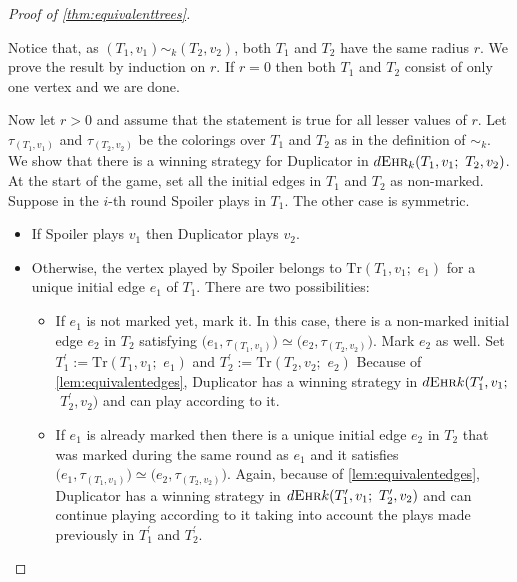 \documentclass[12pt,notitlepage,a4paper]{article}
\theoremstyle{definition}
\newcommand{\morph}[1]{\sim_#1}
\newcommand{\ehr}{\textsc{Ehr}}
\begin{document}
\begin{proof}[Proof of \cref{thm:equivalenttrees}]~ \par
	Notice that, as $(T_1,v_1)\morph{k} (T_2,v_2)$, both $T_1$ and
	$T_2$ have the same radius $r$.
	We prove the result by induction on $r$.
	If $r=0$ then both $T_1$ and $T_2$ consist
	of only one vertex and we are done. \par
	Now let $r>0$ and assume that the 
	statement is true for all lesser values of $r$.
	Let $\tau_{(T_1,v_1)}$ and $\tau_{(T_2,v_2)}$ 
	be the colorings over $T_1$ and $T_2$ as in 
	the definition of $\sim_k$. 
	We show that there is a winning strategy 
	for Duplicator in
	$d\ehr_k(T_1,v_1;\,\, T_2,v_2)$.
	At the start of the game, set all the initial edges
	in $T_1$ and $T_2$ as non-marked. 
	Suppose in the $i$-th round Spoiler plays in 
	$T_1$. The other case is symmetric. 
	\begin{itemize}[leftmargin=*]
		\item If Spoiler plays $v_1$ then Duplicator plays $v_2$.
		\item Otherwise, the vertex played by Spoiler belongs to
		$\mathrm{Tr}(T_1,v_1;\,\,e_1)$
		for a unique initial edge $e_1$ of $T_1$. 
		There are two possibilities:
		\begin{itemize}[leftmargin=*]
			\item If $e_1$ is not marked yet, mark it. 
			In this case, there is a 
			non-marked initial
			edge $e_2$ in $T_2$ satisfying 
			$\big(e_1,\tau_{(T_1,v_1)}\big)\simeq
			\big(e_2,\tau_{(T_2,v_2)}  \big)$.
			Mark $e_2$ as well. 
			Set $T^\prime_1:=\mathrm{Tr}(T_1,v_1;\,\,e_1)$
			and
			$T^\prime_2:=\mathrm{Tr}(T_2,v_2;\,\,e_2)$
			Because of
			\cref{lem:equivalentedges}, Duplicator
			has a winning strategy in
			$ d\ehr{k}(T^\prime_1, v_1;$ $\,\, T^\prime_2,v_2)$
			and can play according to it.
			\item If $e_1$ is already marked then there is
			a unique initial edge $e_2$ in $T_2$ that was 
			marked during the same round as $e_1$ and it satisfies 
			$\big(e_1,\tau_{(T_1,v_1)}\big)\simeq
			\big(e_2,\tau_{(T_2,v_2)}  \big)$.	
			Again, because of \cref{lem:equivalentedges}, 
			Duplicator has a winning strategy in
			$d\ehr{k}(T^\prime_1, v_1; \,\, T^\prime_2,v_2)$
			and can continue playing according to it taking
			into account the plays made previously in 
			$T^\prime_1$ and $T^\prime_2$.	
		\end{itemize}
	\end{itemize}
\end{proof}
\end{document}
